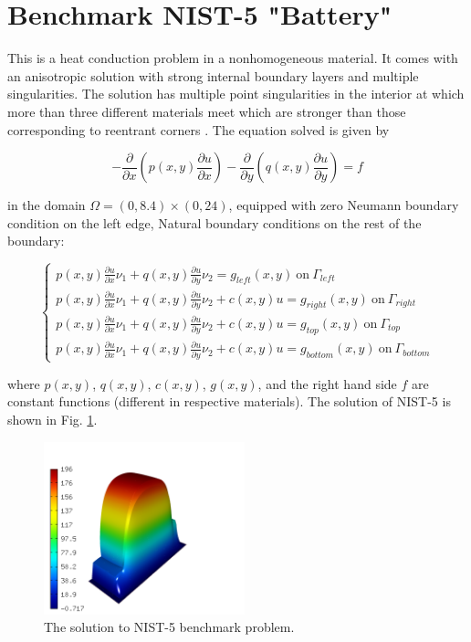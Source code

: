 \section{Benchmark NIST-5 "Battery"}
\label{sec:bench-5}

This is a heat conduction problem in a nonhomogeneous material.
It comes with an anisotropic solution with strong internal boundary
layers and multiple singularities.
The solution has multiple point singularities in the interior at which
more than three different materials meet which are stronger than those
corresponding to reentrant corners \cite{demkowicz-1}.
The equation solved is given by

\begin{equation} \label{heat-conduction}
-\frac{\partial }{\partial x}\left(p(x, y)\frac{\partial u}{\partial x}\right)
-\frac{\partial }{\partial y}\left(q(x, y)\frac{\partial u}{\partial y}\right) = f
\end{equation}

in the domain $\Omega = (0, 8.4) \times (0, 24)$, equipped with
zero Neumann boundary condition on the left edge, Natural boundary
conditions on the rest of the boundary:

\begin{equation}
\left\{
\begin{array}{l}
\displaystyle p(x, y)\frac{\partial u}{\partial x}\nu_1 + q(x, y)\frac{\partial u}{\partial y}\nu_2 = g_{left}(x, y) \ \mbox{on} \  \Gamma_{left} \\
\displaystyle p(x, y)\frac{\partial u}{\partial x}\nu_1 + q(x, y)\frac{\partial u}{\partial y}\nu_2 + c(x, y)u = g_{right}(x, y) \ \mbox{on} \ \Gamma_{right} \\
\displaystyle p(x, y)\frac{\partial u}{\partial x}\nu_1 + q(x, y)\frac{\partial u}{\partial y}\nu_2 + c(x, y)u = g_{top}(x, y) \ \mbox{on} \ \Gamma_{top} \\
\displaystyle p(x, y)\frac{\partial u}{\partial x}\nu_1 + q(x, y)\frac{\partial u}{\partial y}\nu_2 + c(x, y)u = g_{bottom}(x, y) \ \mbox{on} \ \Gamma_{bottom}
\end{array}
\right.
\end{equation}

where $p(x, y)$, $q(x, y)$, $c(x, y)$, $g(x, y)$, and the right hand 
side $f$ are constant functions (different in respective materials).
The solution of NIST-5 is shown in Fig. \ref{fig:sln-nist05}.

\begin{figure}[!ht]
\centering
\includegraphics[height=5cm]{nist/nist-5/solution.png}
\caption{The solution to NIST-5 benchmark problem.}
\label{fig:sln-nist05}
\end{figure}

